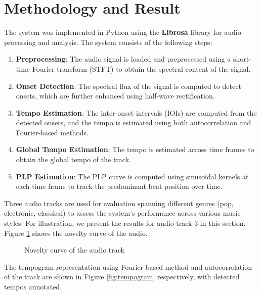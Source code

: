 \documentclass[
paper=A4,               %
pagesize=auto,          %
fontsize=12pt,          %
DIV=16,                 %
twoside=false,           %
BCOR=20mm,              %
parskip=false,          %
chapterprefix=true,     %
appendixprefix=true,    %
listof=totoc,           %
bibliography=totoc,     %
headinclude=true,       %
footinclude=false,      %
headsepline=false,       %
footsepline=false,      %
headings=small,         %
numbers=noenddot        %
] {scrbook}
\begin{document}
\section*{Methodology and Result}
The system was implemented in Python using the \textbf{Librosa} library for audio processing and analysis. The system consists of the following steps:
\begin{enumerate}
    \item \textbf{Preprocessing}: The audio signal is loaded and preprocessed using a short-time Fourier transform (STFT) to obtain the spectral content of the signal.
    \item \textbf{Onset Detection}: The spectral flux of the signal is computed to detect onsets, which are further enhanced using half-wave rectification.
    \item \textbf{Tempo Estimation}: The inter-onset intervals (IOIs) are computed from the detected onsets, and the tempo is estimated using both autocorrelation and Fourier-based methods.
    \item \textbf{Global Tempo Estimation}: The tempo is estimated across time frames to obtain the global tempo of the track.
    \item \textbf{PLP Estimation}: The PLP curve is computed using sinusoidal kernels at each time frame to track the predominant beat position over time.
\end{enumerate}
Three audio tracks are used for evaluation spanning different genres (pop, electronic, classical) to assess the system's performance across various music styles. For illustration, we present the results for audio track 3 in this section.
Figure \ref{fig:novelty} shows the novelty curve of the audio.
\begin{figure}[b]
    \centering
    \caption{Novelty curve of the audio track}
    \label{fig:novelty}
\end{figure}
The tempogram representation using Fourier-based method and autocorrelation of the track are shown in Figure \ref{fig:tempogram} respectively, with detected tempos annotated.
\end{document}

